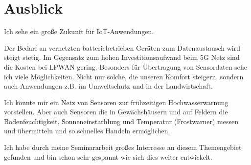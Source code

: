 \documentclass[a4paper, 12pt]{article}
\begin{document}
    \section{Ausblick}
        Ich sehe ein große Zukunft für IoT-Anwendungen.
        
        Der Bedarf an vernetzten batteriebetrieben Geräten zum Datenaustausch wird steigt stetig. Im Gegensatz zum hohen
        Investitionsaufwand beim 5G Netz sind die Kosten bei LPWAN gering. Besonders für Übertragung von Sensordaten 
        sehe ich viele Möglichkeiten. Nicht nur solche, die unseren Komfort steigern, sondern auch 
        Anwendungen z.B. im Umweltschutz und in der Landwirtschaft.

        Ich könnte mir ein Netz von Sensoren zur frühzeitigen Hochwasserwarnung vorstellen. Aber auch Sensoren 
        die in Gewächshäusern und auf Feldern die Bodenfeuchtigkeit, Sonneneinstarhlung und Temperatur (Frostwarner) messen
        und übermitteln und so schnelles Handeln ermöglichen.

        Ich habe durch meine Seminararbeit großes Interresse an diesem Themengebiet gefunden und bin schon 
        sehr gespannt wie sich dies weiter entwickelt.


      
    \newpage
    
    
\end{document}
